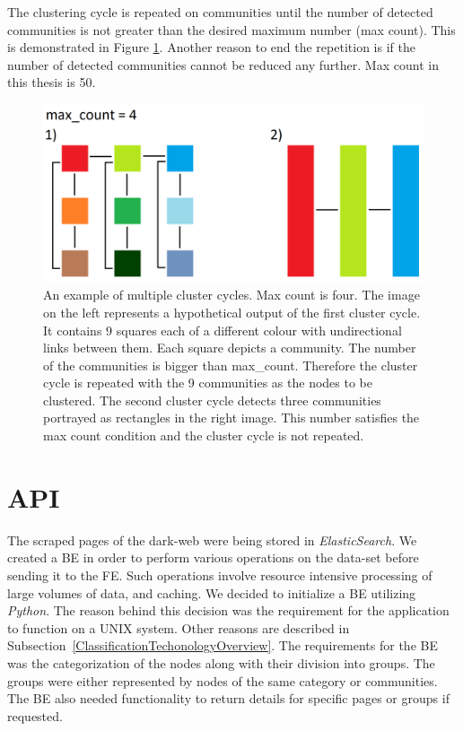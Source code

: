 The clustering cycle is repeated on communities until the number of detected communities is not greater than the desired maximum number (max count). This is demonstrated in Figure \ref{clusteringCyclesExample}. Another reason to end the repetition is if the number of detected communities cannot be reduced any further. Max count in this thesis is 50.
\begin{figure}[ht!]
  \centering
  \includegraphics[width=\textwidth]{Images/clusteringCyclesExample.png}
  \caption{An example of multiple cluster cycles. Max count is four. The image on the left represents a hypothetical output of the first cluster cycle. It contains 9 squares each of a different colour with undirectional links between them. Each square depicts a community. The number of the communities is bigger than max\_count. Therefore the cluster cycle is repeated with the 9 communities as the nodes to be clustered. The second cluster cycle detects three communities portrayed as rectangles in the right image. This number satisfies the max count condition and the cluster cycle is not repeated.}
  \label{clusteringCyclesExample}
\end{figure} 





\section{API}\label{APIDevelopment}
The scraped pages of the dark-web were being stored in \textit{ElasticSearch}. We created a BE in order to perform various operations on the data-set before sending it to the FE. Such operations involve resource intensive processing of large volumes of data, and caching. We decided to initialize a BE utilizing \textit{Python}. The reason behind this decision was the requirement for the application to function on a UNIX system. Other reasons are described in Subsection~\ref{ClassificationTechonologyOverview}. The requirements for the BE was the categorization of the nodes along with their division into groups. The groups were either represented by nodes of the same category or communities. The BE also needed functionality to return details for specific pages or groups if requested.


